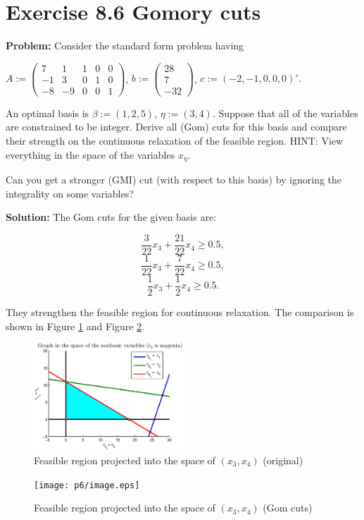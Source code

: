 \section{Exercise 8.6 Gomory cuts}
\textbf{Problem:} Consider the standard form problem having

$A:=\left( \begin{array}{ccccc} 7 & 1 & 1 & 0 & 0 \\ -1 & 3 & 0 & 1 & 0 \\ -8 & -9 & 0 & 0 & 1 \end{array}\right)$, $b:=\left( \begin{array}{c} 28 \\ 7 \\ -32 \end{array}\right)$, $c:=(-2, -1,0,0,0)'.$

An optimal basis is $\beta:=(1,2,5)$, $\eta:=(3,4)$. Suppose that all of the variables are constrained to be integer. Derive all (Gom) cuts for this basis and compare their strength on the continuous relaxation of the feasible region. HINT: View everything in the space of the variables $x_{\eta}$.

Can you get a stronger (GMI) cut (with respect to this basis) by ignoring the integrality on some variables?

\textbf{Solution:} The Gom cuts for the given basis are:

$$ \frac{3}{22}x_3 + \frac{21}{22}x_4 \geq 0.5, $$
$$ \frac{1}{22}x_3 + \frac{7}{22}x_4 \geq 0.5, $$
$$ \frac{1}{2}x_3 + \frac{1}{2}x_4 \geq 0.5. $$

They strengthen the feasible region for continuous relaxation. The comparison is shown in Figure \ref{fig:p1} and Figure \ref{fig:p2}.

\begin{figure}[h!!]
\includegraphics[width=0.5\textwidth]{p6/original.eps}
\caption{Feasible region projected into the space of $(x_3,x_4)$ (original)}\label{fig:p1}
\end{figure}

\begin{figure}[h!!]
\texttt{[image: p6/image.eps]}
\caption{Feasible region projected into the space of $(x_3,x_4)$ (Gom cuts)}\label{fig:p2}
\end{figure}
